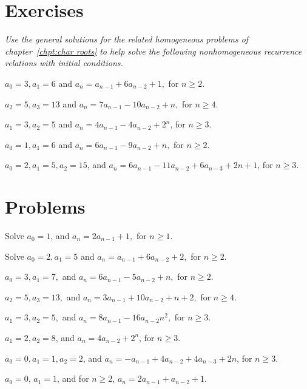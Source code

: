 \section{Exercises}
{\itshape Use the general solutions for the
related homogeneous problems of chapter~\ref{chpt:char roots} to help solve
the following nonhomogeneous recurrence relations with initial conditions.}

\begin{exer}
 $a_0=3, a_1=6$ and $a_n=a_{n-1}+6a_{n-2}+1,$ for $n\geq 2$.
\end{exer}

\begin{exer}
$a_2=5, a_3=13$ and $a_n=7a_{n-1}-10a_{n-2}+n,$ for $n\geq 4$.
\end{exer}

\begin{exer}
$a_1=3, a_2=5$ and $a_n=4a_{n-1}-4a_{n-2}+2^n$, for $n\geq 3$.
\end{exer}

\begin{exer}
$a_0=1, a_1=6$ and $a_n=6a_{n-1}-9a_{n-2}+n,$ for $n\geq 2$.
\end{exer}

\begin{exer}
$a_0=2, a_1=5, a_2 = 15$, and 
$a_n=6a_{n-1}-11a_{n-2}+6a_{n-3}+2n+1$, for $n\geq 3$.
\end{exer}

\section{Problems}

\begin{prob}
Solve $a_0=1$, and $a_n=2a_{n-1} + 1,$ for $n\geq 1$. 
\end{prob}

\begin{prob}
Solve $a_0=2, a_1=5$ and $a_n=a_{n-1}+6a_{n-2} + 2,$ for $n\geq 2$.
\end{prob}


\begin{prob}
$a_0=3,a_1=7,$ and $a_n=6a_{n-1}-5a_{n-2} + n,$ for $n\geq 2$.

\end{prob}


\begin{prob}
$a_2=5, a_3=13,$ and $a_n=3a_{n-1}+10a_{n-2} + n+ 2,$ for $n\geq 4$.
\end{prob}


\begin{prob}
$a_1=3, a_2=5,$ and $a_n=8a_{n-1}-16a_{n-2} n^{2},$ for $n\geq 3$.
\end{prob}


\begin{prob}
$a_1=2, a_2=8$, and $a_n=4a_{n-2} + 2^{n}$, for $n\geq 3$.
\end{prob}


\begin{prob}
$a_0=0, a_1=1, a_2 = 2$, and $a_n=-a_{n-1}+4a_{n-2}+4a_{n-3}+ 2n$, for $n\geq 3$.
\end{prob}


\begin{prob}
$a_0=0$, $a_1=1$, and
for $n\geq 2$, $a_n=2a_{n-1}+a_{n-2}+1$.

\end{prob}






